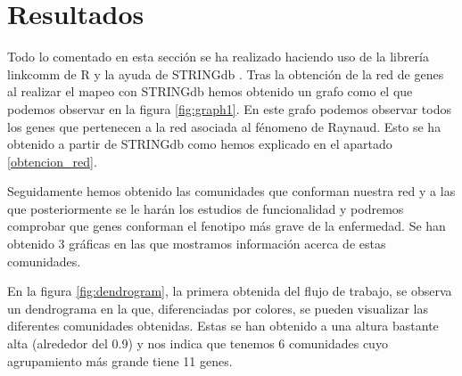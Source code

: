 \section{Resultados}
\label{resultados}
\begin{spacing}{1}
Todo lo comentado en esta sección se ha realizado haciendo uso de la librería linkcomm de R  \cite{Linkcomm}  y la ayuda de STRINGdb \cite{STRINGdb} . 
Tras la obtención de la red de genes al realizar el mapeo con STRINGdb hemos obtenido un grafo como el que podemos observar en la figura \ref{fig:graph1}. En este grafo podemos observar todos los genes que pertenecen a la red asociada al fénomeno de Raynaud. Esto se ha obtenido a partir de STRINGdb como hemos explicado en el apartado \ref{obtencion_red}.
\end{spacing}

\begin{minipage}{\linewidth}
	\label{fig:graph1}
\end{minipage}

\begin{spacing}{1}
	Seguidamente hemos obtenido las comunidades que conforman nuestra red y a las que posteriormente se le harán los estudios de funcionalidad y podremos comprobar que genes conforman el fenotipo más grave de la enfermedad. Se han obtenido 3 gráficas en las que mostramos información acerca de estas comunidades.
	
	En la figura \ref{fig:dendrogram}, la primera obtenida del flujo de trabajo, se observa un dendrograma en la que, diferenciadas por colores, se pueden visualizar las diferentes comunidades obtenidas. Estas se han obtenido a una altura bastante alta (alrededor del 0.9) y nos indica que tenemos 6 comunidades cuyo agrupamiento más grande tiene 11 genes.
\end{spacing}

